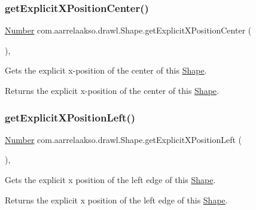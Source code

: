 \subsubsection{\texorpdfstring{get\+Explicit\+X\+Position\+Center()}{getExplicitXPositionCenter()}}
{\footnotesize\ttfamily \hyperlink{interfacecom_1_1aarrelaakso_1_1drawl_1_1_number}{Number} com.\+aarrelaakso.\+drawl.\+Shape.\+get\+Explicit\+X\+Position\+Center (\begin{DoxyParamCaption}{ }\end{DoxyParamCaption})\hspace{0.3cm}{\ttfamily [protected]}, {\ttfamily [inherited]}}



Gets the explicit x-\/position of the center of this \hyperlink{classcom_1_1aarrelaakso_1_1drawl_1_1_shape}{Shape}. 

\begin{DoxyReturn}{Returns}
the explicit x-\/position of the center of this \hyperlink{classcom_1_1aarrelaakso_1_1drawl_1_1_shape}{Shape}. 
\end{DoxyReturn}
\mbox{\label{classcom_1_1aarrelaakso_1_1drawl_1_1_shape_abd7f6c77e2c62100bb72d8ad3085e288}} 
\subsubsection{\texorpdfstring{get\+Explicit\+X\+Position\+Left()}{getExplicitXPositionLeft()}}
{\footnotesize\ttfamily \hyperlink{interfacecom_1_1aarrelaakso_1_1drawl_1_1_number}{Number} com.\+aarrelaakso.\+drawl.\+Shape.\+get\+Explicit\+X\+Position\+Left (\begin{DoxyParamCaption}{ }\end{DoxyParamCaption})\hspace{0.3cm}{\ttfamily [protected]}, {\ttfamily [inherited]}}



Gets the explicit x position of the left edge of this \hyperlink{classcom_1_1aarrelaakso_1_1drawl_1_1_shape}{Shape}. 

\begin{DoxyReturn}{Returns}
the explicit x position of the left edge of this \hyperlink{classcom_1_1aarrelaakso_1_1drawl_1_1_shape}{Shape}. 
\end{DoxyReturn}
\mbox{\label{classcom_1_1aarrelaakso_1_1drawl_1_1_shape_a86920ba43a76d5a02977e5f9ea3509ac}} 
